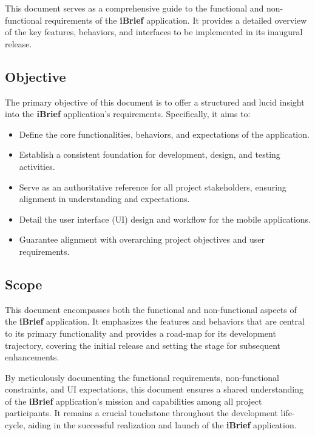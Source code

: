 This document serves as a comprehensive guide to the functional and non-functional requirements of the \textbf{iBrief} application. It provides a detailed overview of the key features, behaviors, and interfaces to be implemented in its inaugural release.

\subsection{Objective}
    The primary objective of this document is to offer a structured and lucid insight into the \textbf{iBrief} application's requirements. Specifically, it aims to:
        \begin{itemize}
            \item Define the core functionalities, behaviors, and expectations of the application.
            \item Establish a consistent foundation for development, design, and testing activities.
            \item Serve as an authoritative reference for all project stakeholders, ensuring alignment in understanding and expectations.
            \item Detail the user interface (\gls{UI}) design and workflow for the \gls{mobile application}s.
            \item Guarantee alignment with overarching project objectives and user requirements.
        \end{itemize}

\subsection{Scope}
    This document encompasses both the functional and non-functional aspects of the \textbf{iBrief} application. It emphasizes the features and behaviors that are central to its primary functionality and provides a road-map for its development trajectory, covering the initial release and setting the stage for subsequent enhancements.

    By meticulously documenting the functional requirements, non-functional constraints, and \gls{UI} expectations, this document ensures a shared understanding of the \textbf{iBrief} application's mission and capabilities among all project participants. It remains a crucial touchstone throughout the development life-cycle, aiding in the successful realization and launch of the \textbf{iBrief} application.





